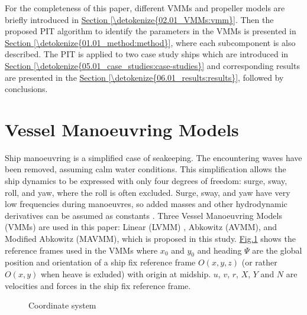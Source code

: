 \documentclass[review]{elsarticle}
\let\sphinxpxdimen\pdfpxdimen\else\newdimen\sphinxpxdimen
\begin{document}
% 
For the completeness of this paper, different VMMs and propeller models are briefly introduced in \hyperref[\detokenize{02.01_VMMs:vmm}]{Section \ref{\detokenize{02.01_VMMs:vmm}}}. Then the proposed PIT algorithm to identify the parameters in the VMMs is presented in \hyperref[\detokenize{01.01_method:method}]{Section \ref{\detokenize{01.01_method:method}}}, where each subcomponent is also described. The PIT is applied to two case study ships which are introduced in \hyperref[\detokenize{05.01_case_studies:case-studies}]{Section \ref{\detokenize{05.01_case_studies:case-studies}}} and corresponding results are presented in the \hyperref[\detokenize{06.01_results:results}]{Section \ref{\detokenize{06.01_results:results}}}, followed by conclusions.



\section{Vessel Manoeuvring Models}
\label{\detokenize{02.01_VMMs:vessel-manoeuvring-model-models}}\label{\detokenize{02.01_VMMs:vmm}}\label{\detokenize{02.01_VMMs::doc}}
 
Ship manoeuvring is a simplified case of seakeeping. The encountering waves have been removed, assuming calm water conditions. This simplification allows the ship dynamics to be expressed with only four degrees of freedom: surge, sway, roll, and yaw, where the roll is often excluded. Surge, sway, and yaw have very low frequencies during manoeuvres, so added masses and other hydrodynamic derivatives can be assumed as constants \cite{fossen_handbook_2021}. Three Vessel Manoeuvring Models (VMMs) are used in this paper: Linear (LVMM) \cite{matusiak_dynamics_2017}, Abkowitz (AVMM), \cite{abkowitz_ship_1964} and Modified Abkowitz (MAVMM), which is proposed in this study.
\hyperref[\detokenize{02.01_VMMs:coordinate-system}]{Fig.\@ \ref{\detokenize{02.01_VMMs:coordinate-system}}} shows the reference frames used in the VMMs where \(x_0\) and \(y_0\) and heading \(\Psi\) are the global position and orientation of a ship fix reference frame \(O(x,y,z)\) (or rather \(O(x,y)\) when heave is exluded) with origin at midship. \(u\), \(v\), \(r\), \(X\), \(Y\) and \(N\) are velocities and forces in the ship fix reference frame.

\begin{figure}[H]
\centering
\capstart

\noindent\sphinxincludegraphics[height=300\sphinxpxdimen]{{coordinate_system}.PNG}
\caption{Coordinate system}\label{\detokenize{02.01_VMMs:coordinate-system}}\end{figure}
\end{document}
